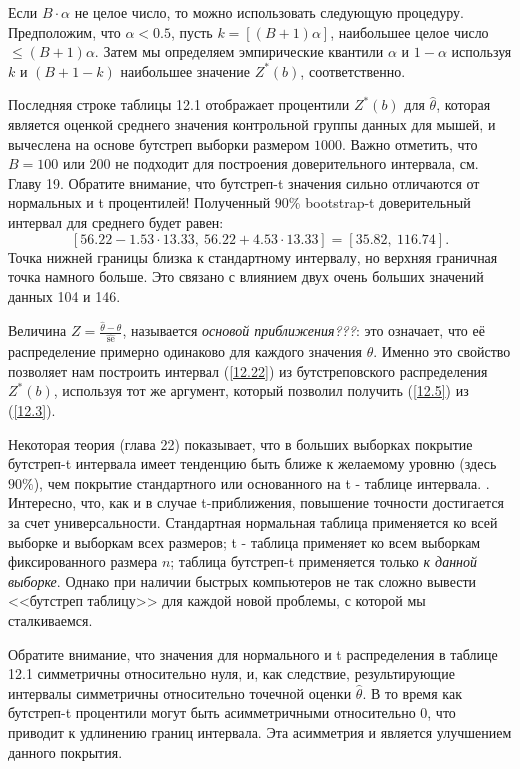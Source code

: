 Если $B \cdot \alpha $  не целое число, то можно использовать следующую процедуру. Предположим, что $\alpha < 0.5$, пусть $k = [(B + 1) \alpha]$, наибольшее целое число $\le(B + 1) \alpha$.
Затем мы определяем эмпирические квантили $\alpha $ и $1 - \alpha$ используя
$k$ и $(B + 1 - k)$ наибольшее значение $Z^{*}(b)$, соответственно. 
 
Последняя строке таблицы 12.1 отображает процентили $Z^{*}(b)$ для $\widehat{\theta}$, которая является оценкой среднего значения контрольной группы данных для мышей, и вычеслена на основе бутстреп выборки размером $1000$. Важно отметить, что $B = 100$ или $200$ не подходит для построения доверительного интервала, см. Главу 19. Обратите внимание, что бутстреп-t значения сильно отличаются от нормальных и t процентилей! Полученный $90 \%$ bootstrap-t доверительный интервал для среднего будет равен:
$$
[56.22- 1.53 \cdot 13.33, \ 56.22 + 4.53 \cdot 13.33] = [35.82, \ 116.74].
$$
Точка нижней границы близка к стандартному интервалу, но верхняя граничная точка намного больше. Это связано с влиянием двух очень больших значений данных 104 и 146.

Величина $Z = \frac{\widehat{\theta} - {\theta}}{\widehat{\text{se}}}$, называется \textit{основой приближения???}: это означает, что её распределение примерно одинаково для каждого значения $\theta$. Именно это свойство позволяет нам построить интервал (\ref{12.22}) из бутстреповского распределения $Z^{*}(b)$, используя тот же аргумент, который позволил получить (\ref{12.5}) из (\ref{12.3}).

Некоторая теория (глава 22) показывает, что в больших выборках покрытие бутстреп-t интервала имеет тенденцию быть ближе к желаемому уровню (здесь $90 \%$), чем покрытие стандартного или основанного на t - таблице интервала. . Интересно, что, как и в случае t-приближения, повышение точности достигается за счет универсальности. Стандартная нормальная таблица применяется ко всей выборке и выборкам всех размеров; t - таблица применяет ко всем выборкам фиксированного размера $n$; таблица бутстреп-t применяется только \textit{к данной выборке}. Однако при наличии быстрых компьютеров не так сложно вывести <<бутстреп таблицу>> для каждой новой проблемы, с которой мы сталкиваемся.

Обратите внимание, что значения для нормального и t распределения в таблице 12.1 симметричны относительно нуля, и, как следствие, результирующие интервалы симметричны относительно точечной оценки $\widehat{\theta}$. В то время как бутстреп-t процентили  могут быть асимметричными относительно 0, что приводит к удлинению границ интервала. Эта асимметрия и является улучшением данного покрытия.


